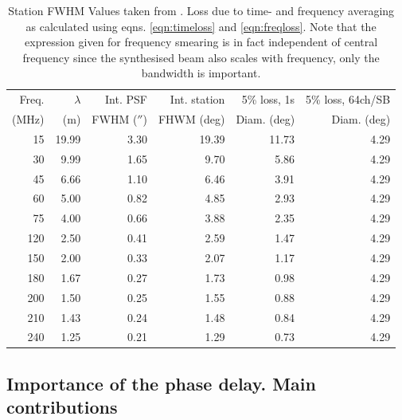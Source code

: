 \documentclass[graybox]{svmult}
\begin{document}
\begin{table}[h]
\centering
\begin{tabular}{rrrrrr}
\hline\hline
Freq. & $\lambda$ & Int. PSF & Int. station& 5\% loss, 1s& 5\% loss, 64ch/SB\\
(MHz) & (m) & FWHM ($''$) & FHWM (deg) & Diam. (deg) & Diam. (deg)\\
\hline
15 & 19.99 & 3.30 & 19.39 & 11.73 & 4.29\\
30 & 9.99 & 1.65 & 9.70 & 5.86 & 4.29\\
45 & 6.66 & 1.10 & 6.46 & 3.91 & 4.29\\
60 & 5.00 & 0.82 & 4.85 & 2.93 & 4.29\\
75 & 4.00 & 0.66 & 3.88 & 2.35 & 4.29\\
120 & 2.50 & 0.41 & 2.59 & 1.47 & 4.29\\
150 & 2.00 & 0.33 & 2.07 & 1.17 & 4.29\\
180 & 1.67 & 0.27 & 1.73 & 0.98 & 4.29\\
200 & 1.50 & 0.25 & 1.55 & 0.88 & 4.29\\
210 & 1.43 & 0.24 & 1.48 & 0.84 & 4.29\\
240 & 1.25 & 0.21 & 1.29 & 0.73 & 4.29\\
\hline
\end{tabular}
\caption{Station FWHM Values taken from \cite[App. B]{vanhaarlem13}. Loss due
to time- and frequency averaging as calculated using eqns.
\ref{eqn:timeloss} and \ref{eqn:freqloss}. Note that the expression
given for frequency smearing is in fact independent of central frequency since
the synthesised beam also scales with frequency, only the
bandwidth is important.
\label{tab:res}}
\end{table}


\subsection{Importance of the phase delay. Main contributions}
\end{document}
